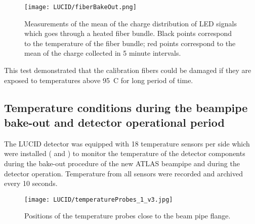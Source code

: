 \begin{figure}
\centering
\texttt{[image: LUCID/fiberBakeOut.png]}
\caption{Measurements of the mean of the charge distribution of LED signals which goes through a heated fiber bundle.
Black points correspond to the temperature of the fiber bundle; red points correspond to the mean of the charge collected in 5 minute intervals.}
\label{fig:fiberBakeOut}
\end{figure}

This test demonstrated that the calibration fibers could be damaged if they are exposed 
to temperatures above 95\degree~C for long period of time.
% 
% 
 
\subsection{Temperature conditions during the beampipe bake-out and detector operational period}

The LUCID detector was equipped with 18 temperature sensors per side which were installed (
and )
to monitor the temperature of the detector components during the bake-out procedure of the new ATLAS beampipe and during the detector operation.
Temperature from all sensors were recorded and archived every 10 seconds.

\begin{figure}
\centering
\texttt{[image: LUCID/temperatureProbes\_1\_v3.jpg]}
\caption{Positions of the temperature probes close to the beam pipe flange.}
\label{fig:TempProbes1}
\end{figure}

